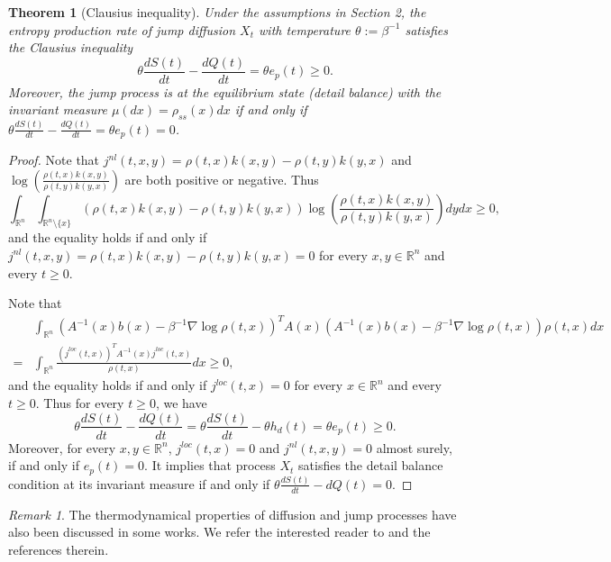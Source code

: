 \documentclass[10pt]{article}
\newtheorem{thm}{Theorem}[section]
\theoremstyle{definition}
\theoremstyle{remark}
\newtheorem{rem}{Remark}[section]
\numberwithin{equation}{section}
\begin{document}
\begin{thm}[Clausius inequality]\label{SecondL}
Under the assumptions in Section 2, the entropy production rate of jump diffusion $X_t$ with temperature $\theta := \beta^{-1}$ satisfies the Clausius inequality
\begin{equation*}
   \theta\frac{dS(t)}{dt} -\frac{dQ(t)}{dt} = \theta e_{p}(t) \geq 0.
\end{equation*}
Moreover, the jump process is at the equilibrium state (detail balance) with the invariant measure $\mu(dx) = \rho_{ss}(x)dx$ if and only if $\theta\frac{dS(t)}{dt} - \frac{dQ(t)}{dt} = \theta e_p(t) = 0$.
\end{thm}
\begin{proof}
Note that $j^{nl}(t,x,y)= \rho(t,x)k(x,y) - \rho(t,y)k(y,x)$ and $\log \left( \frac{\rho(t,x)k(x,y)}{\rho(t,y)k(y,x)} \right)$ are both positive or negative. Thus
\begin{equation*}
    \int_{\mathbb{R}^n}\int_{\mathbb{R}^n \setminus \{x\}} (\rho(t,x)k(x,y) - \rho(t,y)k(y,x))\log \left( \frac{\rho(t,x)k(x,y)}{\rho(t,y)k(y,x)} \right) dydx \geq 0,
\end{equation*}
and the equality holds if and only if $j^{nl}(t,x,y)= \rho(t,x)k(x,y) - \rho(t,y)k(y,x) = 0$ for every $x,y \in \mathbb{R}^n$ and every $t \geq 0$.

Note that
\begin{align*}
    & \int_{\mathbb{R}^n} (A^{-1}(x)b(x) - \beta^{-1} \nabla \log\rho(t,x))^{T}A(x)(A^{-1}(x)b(x) - \beta^{-1} \nabla \log\rho(t,x)) \rho(t,x)dx \nonumber \\
    = & \int_{\mathbb{R}^n} \frac{(j^{loc}(t,x))^TA^{-1}(x)j^{loc}(t,x) }{\rho(t,x)}dx \geq 0,
\end{align*}
and the equality holds if and only if $j^{loc}(t,x) = 0$ for every $x\in \mathbb{R}^n$ and every $t \geq 0$.
Thus for every $t \geq 0$, we have
\begin{equation*}
    \theta \frac{dS(t)}{dt} - \frac{dQ(t)}{dt} = \theta \frac{dS(t)}{dt} - \theta h_{d}(t)= \theta e_{p}(t)\geq 0.
\end{equation*}
Moreover, for every $x,y\in \mathbb{R}^n$, $j^{loc}(t,x) = 0$ and $j^{nl}(t,x,y)=0$ almost surely, if and only if $e_{p}(t) =0$. It implies that process $X_t$ satisfies the detail balance condition at its invariant measure if and only if $\theta\frac{dS(t)}{dt} - dQ(t) =0$.
\end{proof}

\begin{rem}
    The thermodynamical properties of diffusion and jump processes have also been discussed in some works. We refer the interested reader to \cite{MNW08,S05,JQQ04,stochasticThermo1,stochasticThermo2} and the references therein.
\end{rem}
\end{document}
